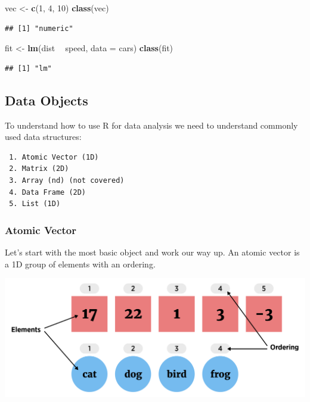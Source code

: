 \documentclass[
]{book}
\newenvironment{Shaded}{\begin{snugshade}}{\end{snugshade}}
\newcommand{\DataTypeTok}[1]{\textcolor[rgb]{0.13,0.29,0.53}{#1}}
\newcommand{\DecValTok}[1]{\textcolor[rgb]{0.00,0.00,0.81}{#1}}
\newcommand{\KeywordTok}[1]{\textcolor[rgb]{0.13,0.29,0.53}{\textbf{#1}}}
\newcommand{\NormalTok}[1]{#1}
\newcommand{\OperatorTok}[1]{\textcolor[rgb]{0.81,0.36,0.00}{\textbf{#1}}}
\newcommand{\StringTok}[1]{\textcolor[rgb]{0.31,0.60,0.02}{#1}}
\theoremstyle{definition}
\theoremstyle{definition}
\theoremstyle{definition}
\theoremstyle{remark}
\begin{document}
\begin{Shaded}
\begin{Highlighting}[]
\NormalTok{vec <-}\StringTok{ }\KeywordTok{c}\NormalTok{(}\DecValTok{1}\NormalTok{, }\DecValTok{4}\NormalTok{, }\DecValTok{10}\NormalTok{)}
\KeywordTok{class}\NormalTok{(vec)}
\end{Highlighting}
\end{Shaded}

\begin{verbatim}
## [1] "numeric"
\end{verbatim}

\begin{Shaded}
\begin{Highlighting}[]
\NormalTok{fit <-}\StringTok{ }\KeywordTok{lm}\NormalTok{(dist }\OperatorTok{~}\StringTok{ }\NormalTok{speed, }\DataTypeTok{data =}\NormalTok{ cars)}
\KeywordTok{class}\NormalTok{(fit)}
\end{Highlighting}
\end{Shaded}

\begin{verbatim}
## [1] "lm"
\end{verbatim}

\hypertarget{data-objects}{%
\subsection{Data Objects}\label{data-objects}}

To understand how to use R for data analysis we need to understand commonly used data structures:

\begin{verbatim}
 1. Atomic Vector (1D)  
 2. Matrix (2D)  
 3. Array (nd) (not covered)  
 4. Data Frame (2D)  
 5. List (1D)  
\end{verbatim}

\hypertarget{atomic-vector}{%
\subsubsection{Atomic Vector}\label{atomic-vector}}

Let's start with the most basic object and work our way up. An atomic vector is a 1D group of elements with an ordering.

\begin{center}\includegraphics[width=0.8\linewidth]{img/vectorVisualF} \end{center}
\end{document}
